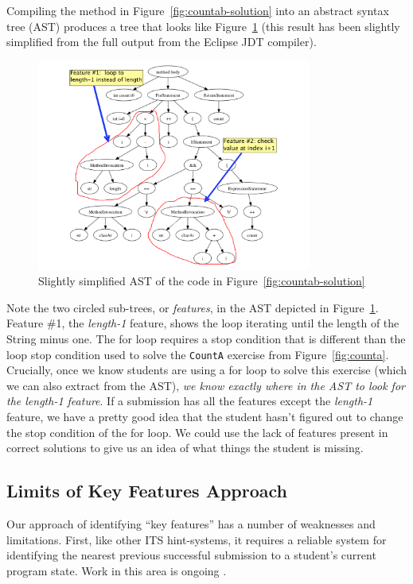 \documentclass{sig-alternate}
\begin{document}
Compiling the method in Figure~\ref{fig:countab-solution} into an
abstract syntax tree (AST) produces a tree that looks like
Figure~\ref{fig:countab-ast} (this result has been slightly simplified
from the full output from the Eclipse JDT compiler).

\begin{figure}[h]
\includegraphics[width=90mm]{images/forloop-highlight}
\caption{Slightly simplified AST of the code in Figure~\ref{fig:countab-solution}}
\label{fig:countab-ast}
\end{figure}

Note the two circled sub-trees, or {\em features}, in the AST depicted
in Figure~\ref{fig:countab-ast}.  Feature \#1, the {\em
  length-1} feature, shows the loop iterating
until the length of the String minus one.  The for loop requires a
stop condition that is different
than the loop stop condition used to solve the {\tt CountA} exercise from
Figure~\ref{fig:counta}.  Crucially, once we know students are
using a for loop to solve this exercise (which we can also
extract from the AST), {\em we know exactly where in the AST to
  look for the length-1 feature}.  If a submission has all the
features except the {\em length-1} feature, we have a pretty good idea
that the student hasn't figured out to change the stop condition of the
for loop.  We could use the lack of features present in correct
solutions to give us an idea of what things the student is missing.


\subsection{Limits of Key Features Approach}

Our approach of identifying ``key features'' has a number of
weaknesses and limitations.  First, like other ITS hint-systems, it
requires a reliable system for identifying the nearest previous successful
submission to a student's current program state.  Work in this area is
ongoing \cite{rivers-its2012,Jin:2012:PRA:2345840.2345889}.
\end{document}

